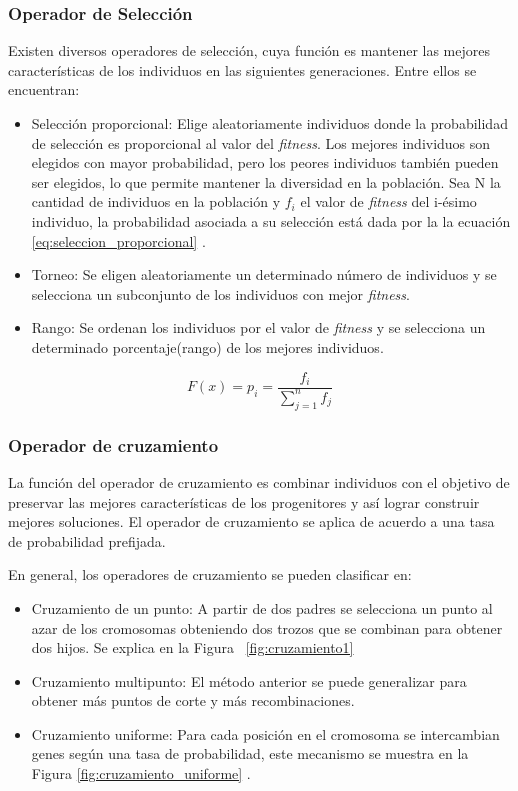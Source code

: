 \subsubsection{Operador de Selección}
Existen diversos operadores de selección, cuya función es mantener las mejores características de los individuos en las siguientes generaciones. Entre ellos se encuentran:
\begin{itemize}
	\item Selección proporcional: Elige aleatoriamente individuos donde la probabilidad de selección es proporcional al valor del \emph{fitness}. Los mejores individuos son elegidos con mayor probabilidad, pero los peores individuos también pueden ser elegidos, lo que permite mantener la diversidad en la población. Sea N la cantidad de individuos en la población y $f_i$ el valor de \emph{fitness} del i-ésimo individuo, la probabilidad asociada a su selección está dada por la la ecuación \ref{eq:seleccion_proporcional} .
	\item Torneo: Se eligen aleatoriamente un determinado número de individuos y se selecciona un subconjunto de los individuos con mejor \emph{fitness}.
	\item Rango: Se ordenan los individuos por el valor de \emph{fitness} y se selecciona un determinado porcentaje(rango) de los mejores individuos.
\end{itemize}

\begin{equation}
\label{eq:seleccion_proporcional}
F(x) =  p_i = \frac{f_i}{\sum_{j=1}^{n}{f_j}}  
\end{equation}
        
        
\subsubsection{Operador de cruzamiento}
La función del operador de cruzamiento es combinar individuos con el objetivo de preservar las mejores características de los progenitores y así lograr construir mejores soluciones. El operador de cruzamiento se aplica de acuerdo a una tasa de probabilidad prefijada. 


En general, los operadores de cruzamiento se pueden clasificar en:

\begin{itemize}
	\item Cruzamiento de un punto: A partir de dos padres se selecciona un punto al azar de los cromosomas obteniendo dos trozos que se combinan para obtener dos hijos. Se explica en la Figura ~\ref{fig:cruzamiento1}
	\item Cruzamiento multipunto: El método anterior se puede generalizar para obtener más puntos de corte y más recombinaciones.
	\item Cruzamiento uniforme: Para cada posición en el cromosoma se   intercambian genes según una tasa de probabilidad, este mecanismo se muestra en la Figura \ref{fig:cruzamiento_uniforme} .	
\end{itemize}

